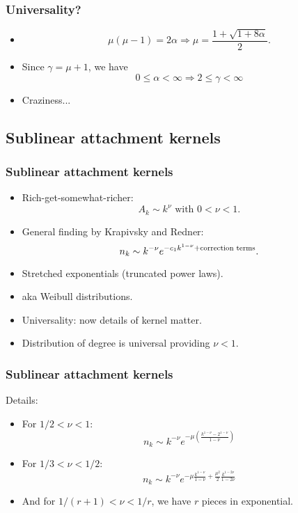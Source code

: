 \begin{frame}
  \frametitle{Universality?}

  \begin{itemize}
  \item<1-> 
    $$
    \mu(\mu-1) = 2\alpha \Rightarrow \mu = \frac{1+\sqrt{1+8\alpha}}{2}.
    $$
  \item<2-> Since $\gamma = \mu+1$, we have
    $$
    0 \le \alpha < \infty \Rightarrow 2 \le \gamma < \infty
    $$
  \item<3-> Craziness...    
  \end{itemize}

\end{frame}

\subsection{Sublinear attachment kernels}

\begin{frame}
  \frametitle{Sublinear attachment kernels}

  \begin{itemize}
  \item<1-> 
    Rich-get-somewhat-richer:
    $$
    A_k \sim k^\nu
    \mbox{\ with $0 < \nu < 1$.}
    $$
  \item<2->
    General finding by Krapivsky and Redner:\cite{krapivsky2001a}
    $$
    n_k 
    \sim 
    k^{-\nu}
    e^{-c_1 k^{1-\nu} + \mbox{\scriptsize correction terms}}.
    $$
  \item<3->
    Stretched exponentials (truncated power laws).
  \item<4->
    aka Weibull distributions.
  \item<5->
    \alert{Universality}: now details of kernel  matter.
  \item<6->
    Distribution of degree is universal providing $\nu<1$.
  \end{itemize}

\end{frame}

\begin{frame}
  \frametitle{Sublinear attachment kernels}

  \begin{block}{Details:}
    \begin{itemize}
    \item<1->
      For $1/2 < \nu < 1$:
      $$
      n_k \sim k^{-\nu} e^{-\mu \left(\frac{k^{1-\nu} - 2^{1-\nu}}{1-\nu} \right)}
      $$
    \item<2->
      For $1/3 < \nu < 1/2$:
      $$
      n_k \sim k^{-\nu} e^{-\mu \frac{k^{1-\nu}}{1-\nu} + \frac{\mu^2}{2}\frac{k^{1-2\nu}}{1-2\nu}}
      $$
    \item<3->
      And for $1/(r+1) < \nu < 1/r$, we have $r$ pieces in exponential.
    \end{itemize}
  \end{block}

\end{frame}

